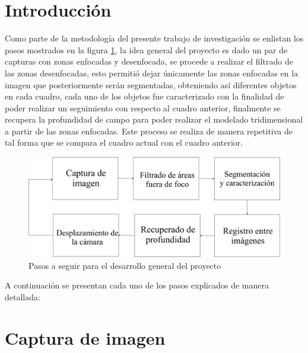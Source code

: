 
\section{Introducción}

Como parte de la metodología del presente trabajo de investigación se enlistan los pasos mostrados en la figura \ref{fig_0_met}, la idea general del proyecto es dado un par de capturas con zonas enfocadas y desenfocada, se procede a realizar el filtrado de las zonas desenfocadas, esto permitió dejar únicamente las zonas enfocadas en la imagen que posteriormente serán segmentadas, obteniendo así diferentes objetos en cada cuadro, cada uno de los objetos fue caracterizado con la finalidad de poder realizar un seguimiento con respecto al cuadro anterior, finalmente se recupera la profundidad de campo para poder realizar el modelado tridimensional a partir de las zonas enfocadas. 
Este proceso se realiza de manera repetitiva de tal forma que se compara el cuadro actual con el cuadro anterior.

\begin{figure}
\centering
\includegraphics[scale=0.5]{GraficosMetodologia/MetodologiaGeneral.png} 
\caption{Pasos a seguir para el desarrollo general del proyecto}
\label{fig_0_met}
\end{figure}


A continuación se presentan cada uno de los pasos explicados de manera detallada:



\section{Captura de imagen}

